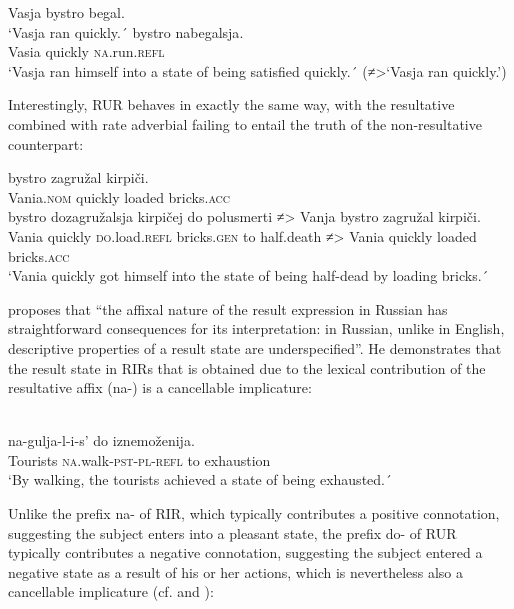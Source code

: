 \documentclass[output=paper,colorlinks,citecolor=brown,nonflat]{./langscibook}
\begin{document}
\ea%
    \label{ex:antonyuk:40}
    \ea \label{ex:antonyuk:40a}
    {Vasja} {bystro} {begal}.\\
    `Vasja ran quickly.´
    \ex \label{ex:antonyuk:40b}
     {bystro} {nabegalsja}.\\
    Vasia quickly \textsc{na}.run.\textsc{refl}\\
    \glt `Vasja ran himself into a state of being satisfied quickly.´ (≠>‘Vasja ran quickly.’)
    \z
\z

Interestingly, RUR behaves in exactly the same way, with the resultative combined with rate adverbial failing to entail the truth of the non-resultative counterpart:

\ea%
    \label{ex:antonyuk:41}
    \ea \label{ex:antonyuk:41a}
             {bystro}   {zagružal} {kirpiči}.\\
    Vania.\textsc{nom} quickly loaded     bricks.\textsc{acc}\\
    \ex \label{ex:antonyuk:41b}
     {bystro}     {dozagružalsja}   {kirpičej}       {do}  {polusmerti} {≠>} {Vanja}  {bystro}   {zagružal}   {kirpiči}. \\
    Vania quickly \textsc{do}.load.\textsc{refl}   bricks.\textsc{gen}  to  half.death  ≠> Vania quickly loaded   bricks.\textsc{acc}\\
    \glt `Vania quickly got himself into the state of being half-dead by loading bricks.´
    \z
\z

\citeauthor{Tatevosov2010} proposes that “the affixal nature of the result expression in Russian has straightforward consequences for its interpretation: in Russian, unlike in English, descriptive properties of a result state are underspecified”. He demonstrates that the result state in RIRs that is obtained due to the lexical contribution of the resultative affix ({na}{}-) is a cancellable implicature:

\ea%
    \label{ex:antonyuk:42}
    \citep{Tatevosov2010}\\
     {na-gulja-l-i-s’} {do} {iznemoženija}.\\
    Tourists   \textsc{na}.walk\textsc{-pst-pl-refl} to exhaustion\\
    \glt `By walking, the tourists achieved a state of being exhausted.´ 
    \z

Unlike the prefix {na}{}- of RIR, which typically contributes a positive connotation, suggesting the subject enters into a pleasant state, the prefix {do{}-} of RUR typically contributes a negative connotation, suggesting the subject entered a negative state as a result of his or her actions, which is nevertheless also a cancellable implicature (cf.  and ):
\end{document}
